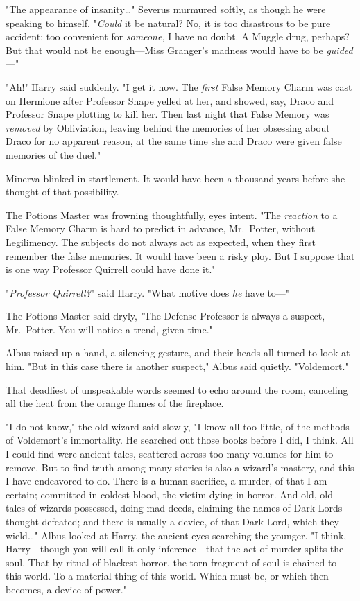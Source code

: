 "The appearance of insanity{\ldots}" Severus murmured softly, as though he were
speaking to himself. "\emph{Could} it be natural? No, it is too disastrous to
be pure accident; too convenient for \emph{someone,} I have no doubt. A Muggle
drug, perhaps? But that would not be enough---Miss Granger's madness would have
to be \emph{guided}---"

"Ah!" Harry said suddenly. "I get it now. The \emph{first} False Memory Charm
was cast on Hermione after Professor Snape yelled at her, and showed, say,
Draco and Professor Snape plotting to kill her. Then last night that False
Memory was \emph{removed} by Obliviation, leaving behind the memories of her
obsessing about Draco for no apparent reason, at the same time she and Draco
were given false memories of the duel."

Minerva blinked in startlement. It would have been a thousand years before she
thought of that possibility.

The Potions Master was frowning thoughtfully, eyes intent. "The \emph{reaction}
to a False Memory Charm is hard to predict in advance, Mr.~Potter, without
Legilimency. The subjects do not always act as expected, when they first
remember the false memories. It would have been a risky ploy. But I suppose
that is one way Professor Quirrell could have done it."

"\emph{Professor Quirrell?}" said Harry. "What motive does \emph{he} have to---"

The Potions Master said dryly, "The Defense Professor is always a suspect,
Mr.~Potter. You will notice a trend, given time."

Albus raised up a hand, a silencing gesture, and their heads all turned to look
at him. "But in this case there is another suspect," Albus said quietly.
"Voldemort."

That deadliest of unspeakable words seemed to echo around the room, canceling
all the heat from the orange flames of the fireplace.

"I do not know," the old wizard said slowly, "I know all too little, of the
methods of Voldemort's immortality. He searched out those books before I did, I
think. All I could find were ancient tales, scattered across too many volumes
for him to remove. But to find truth among many stories is also a wizard's
mastery, and this I have endeavored to do. There is a human sacrifice, a
murder, of that I am certain; committed in coldest blood, the victim dying in
horror. And old, old tales of wizards possessed, doing mad deeds, claiming the
names of Dark Lords thought defeated; and there is usually a device, of that
Dark Lord, which they wield{\ldots}" Albus looked at Harry, the ancient eyes
searching the younger. "I think, Harry---though you will call it only
inference---that the act of murder splits the soul. That by ritual of blackest
horror, the torn fragment of soul is chained to this world. To a material thing
of this world. Which must be, or which then becomes, a device of power."

